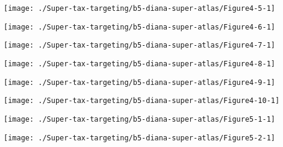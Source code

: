 \documentclass[tikz]{standalone}\usepackage[]{graphicx}\usepackage[]{color}
\newenvironment{knitrout}{}{} %
\begin{document}
\begin{knitrout}
\color{fgcolor}
\texttt{[image: ./Super-tax-targeting/b5-diana-super-atlas/Figure4-5-1]} 

\end{knitrout}

\begin{knitrout}
\color{fgcolor}
\texttt{[image: ./Super-tax-targeting/b5-diana-super-atlas/Figure4-6-1]} 

\end{knitrout}

\begin{knitrout}
\color{fgcolor}
\texttt{[image: ./Super-tax-targeting/b5-diana-super-atlas/Figure4-7-1]} 

\end{knitrout}

\begin{knitrout}
\color{fgcolor}
\texttt{[image: ./Super-tax-targeting/b5-diana-super-atlas/Figure4-8-1]} 

\end{knitrout}

\begin{knitrout}
\color{fgcolor}
\texttt{[image: ./Super-tax-targeting/b5-diana-super-atlas/Figure4-9-1]} 

\end{knitrout}

\begin{knitrout}
\color{fgcolor}
\texttt{[image: ./Super-tax-targeting/b5-diana-super-atlas/Figure4-10-1]} 

\end{knitrout}

\begin{knitrout}
\color{fgcolor}
\texttt{[image: ./Super-tax-targeting/b5-diana-super-atlas/Figure5-1-1]} 

\end{knitrout}

\begin{knitrout}
\color{fgcolor}
\texttt{[image: ./Super-tax-targeting/b5-diana-super-atlas/Figure5-2-1]} 

\end{knitrout}
\end{document}
